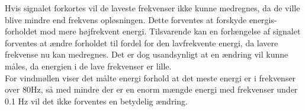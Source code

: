 Hvis signalet forkortes vil de laveste frekvenser ikke kunne medregnes, da de ville blive mindre end frekvens opløsningen. Dette forventes at forskyde energis-forholdet mod mere højfrekvent energi. Tilsvarende kan en forlængelse af signalet  forventes at ændre forholdet til fordel for den lavfrekvente energi, da lavere frekvense nu kan medregnes. Det er dog usandsynligt at en ændring vil kunne måles, da energien i de lave frekvenser er lille.\\

For vindmøllen viser det målte energi forhold at det meste energi er i frekvenser over 80Hz, så med mindre der er en enorm mængde energi med frekvenser under 0.1 Hz vil det ikke forventes en betydelig ændring.

 
